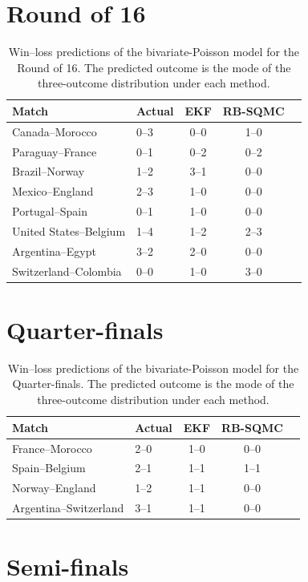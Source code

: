 \section{Round of 16}

\begin{table}[H]
\centering
\begin{tabular}{llccc}
\toprule
Match & Actual & EKF & RB-SQMC \\
\midrule
Canada--Morocco & 0--3 & 0--0 & 1--0 \\
Paraguay--France & 0--1 & 0--2 & 0--2 \\
Brazil--Norway & 1--2 & 3--1 & 0--0 \\
Mexico--England & 2--3 & 1--0 & 0--0 \\
Portugal--Spain & 0--1 & 1--0 & 0--0 \\
United States--Belgium & 1--4 & 1--2 & 2--3 \\
Argentina--Egypt & 3--2 & 2--0 & 0--0 \\
Switzerland--Colombia & 0--0 & 1--0 & 3--0 \\
\bottomrule
\end{tabular}
\caption{Win--loss predictions of the bivariate-Poisson model for the Round of 16. The predicted outcome is the mode of the three-outcome distribution under each method.}
\end{table}

\section{Quarter-finals}

\begin{table}[H]
\centering
\begin{tabular}{llccc}
\toprule
Match & Actual & EKF & RB-SQMC \\
\midrule
France--Morocco & 2--0 & 1--0 & 0--0 \\
Spain--Belgium & 2--1 & 1--1 & 1--1 \\
Norway--England & 1--2 & 1--1 & 0--0 \\
Argentina--Switzerland & 3--1 & 1--1 & 0--0 \\
\bottomrule
\end{tabular}
\caption{Win--loss predictions of the bivariate-Poisson model for the Quarter-finals. The predicted outcome is the mode of the three-outcome distribution under each method.}
\end{table}

\section{Semi-finals}

